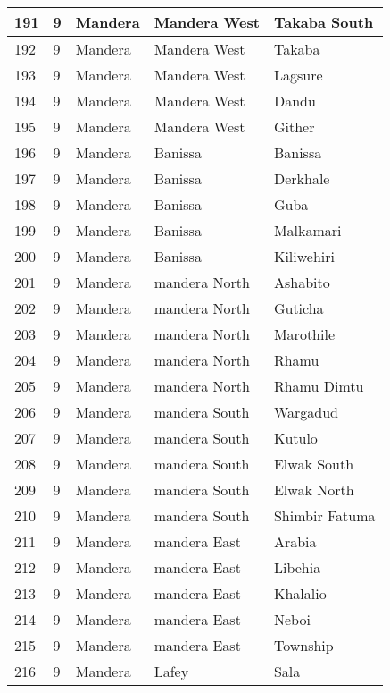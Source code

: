 \begin{table}[!ht]
\begin{tabular}{|l|l|l|l|l|}
        191 & 9 & Mandera & Mandera West & Takaba South \\ \hline
        192 & 9 & Mandera & Mandera West & Takaba \\ \hline
        193 & 9 & Mandera & Mandera West & Lagsure \\ \hline
        194 & 9 & Mandera & Mandera West & Dandu \\ \hline
        195 & 9 & Mandera & Mandera West & Gither \\ \hline
        196 & 9 & Mandera & Banissa & Banissa \\ \hline
        197 & 9 & Mandera & Banissa & Derkhale \\ \hline
        198 & 9 & Mandera & Banissa & Guba \\ \hline
        199 & 9 & Mandera & Banissa & Malkamari \\ \hline
        200 & 9 & Mandera & Banissa & Kiliwehiri \\ \hline
        201 & 9 & Mandera & mandera North & Ashabito \\ \hline
        202 & 9 & Mandera & mandera North & Guticha \\ \hline
        203 & 9 & Mandera & mandera North & Marothile \\ \hline
        204 & 9 & Mandera & mandera North & Rhamu \\ \hline
        205 & 9 & Mandera & mandera North & Rhamu Dimtu \\ \hline
        206 & 9 & Mandera & mandera South & Wargadud \\ \hline
        207 & 9 & Mandera & mandera South & Kutulo \\ \hline
        208 & 9 & Mandera & mandera South & Elwak South \\ \hline
        209 & 9 & Mandera & mandera South & Elwak North \\ \hline
        210 & 9 & Mandera & mandera South & Shimbir Fatuma \\ \hline
        211 & 9 & Mandera & mandera East & Arabia \\ \hline
        212 & 9 & Mandera & mandera East & Libehia \\ \hline
        213 & 9 & Mandera & mandera East & Khalalio \\ \hline
        214 & 9 & Mandera & mandera East & Neboi \\ \hline
        215 & 9 & Mandera & mandera East & Township \\ \hline
        216 & 9 & Mandera & Lafey & Sala \\ \hline

\end{tabular}
\end{table}
